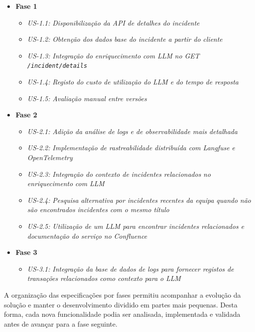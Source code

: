 		\begin{itemize}
			\item \textbf{Fase 1}
			\begin{itemize}
				\item \textit{US-1.1: Disponibilização da \gls{API} de detalhes do incidente}
				\item \textit{US-1.2: Obtenção dos dados base do incidente a partir do cliente}
				\item \textit{US-1.3: Integração do enriquecimento com \gls{LLM} no \textit{GET} \texttt{/incident/details}}
				\item \textit{US-1.4: Registo do custo de utilização do \gls{LLM} e do tempo de resposta}
				\item \textit{US-1.5: Avaliação manual entre versões}
			\end{itemize}
			
			\item \textbf{Fase 2}
			\begin{itemize}
				\item \textit{US-2.1: Adição da análise de logs e de observabilidade mais detalhada}
				\item \textit{US-2.2: Implementação de rastreabilidade distribuída com \textit{Langfuse} e \textit{OpenTelemetry}}
				\item \textit{US-2.3: Integração do contexto de incidentes relacionados no enriquecimento com \gls{LLM}}
				\item \textit{US-2.4: Pesquisa alternativa por incidentes recentes da equipa quando não são encontrados incidentes com o mesmo título}
				\item \textit{US-2.5: Utilização de um \gls{LLM} para encontrar incidentes relacionados e documentação do serviço no Confluence}
			\end{itemize}
			
			\item \textbf{Fase 3}
			\begin{itemize}
				\item \textit{US-3.1: Integração da base de dados de \textit{logs} para fornecer registos de transações relacionados como contexto para o \gls{LLM}}
			\end{itemize}
		\end{itemize}
		
		A organização das especificações por fases permitiu acompanhar a evolução da solução e manter o desenvolvimento dividido em partes mais pequenas. Desta forma, cada nova funcionalidade podia ser analisada, implementada e validada antes de avançar para a fase seguinte.

